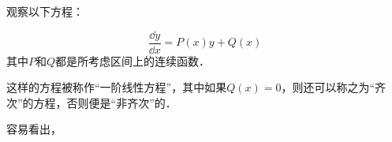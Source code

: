 

观察以下方程：

\begin{equation}
\frac{\dd y}{\dd x}=P(x)y+Q(x)
\end{equation}
其中$P$和$Q$都是所考虑区间上的连续函数．

这样的方程被称作“一阶线性方程”，其中如果$Q(x)=0$，则还可以称之为“齐次”的方程，否则便是“非齐次”的．

容易看出，















